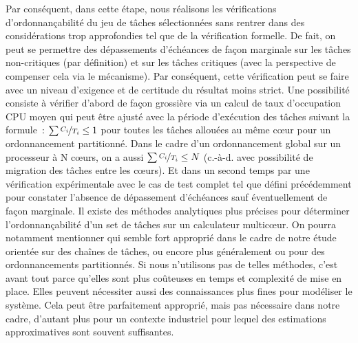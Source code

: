 \documentclass[french, a4paper, 11pt, twoside, pdftex]{StyleThese}
\begin{document}
		Par conséquent, dans cette étape, nous réalisons les vérifications d'ordonnançabilité du jeu de tâches sélectionnées sans rentrer dans des considérations trop approfondies tel que de la vérification formelle. De fait, on peut se permettre des dépassements d'échéances de façon marginale sur les tâches non-critiques (par définition) et sur les tâches critiques (avec la perspective de compenser cela via le mécanisme). Par conséquent, cette vérification peut se faire avec un niveau d'exigence et de certitude du résultat moins strict. Une possibilité consiste à vérifier d'abord de façon grossière via un calcul de taux d'occupation CPU moyen qui peut être ajusté avec la période d'exécution des tâches suivant la formule~:	$ \sum{\nicefrac{C_i}{T_i}} \leq 1 $ pour toutes les tâches allouées au même cœur pour un ordonnancement partitionné. Dans le cadre d'un ordonnancement global sur un processeur à N cœurs, on a aussi $ \sum{\nicefrac{C_i}{T_i}} \leq N $ (c.-à-d. avec possibilité de migration des tâches entre les cœurs). Et dans un second temps par une vérification expérimentale avec le cas de test complet tel que défini précédemment pour constater l'absence de dépassement d'échéances sauf éventuellement de façon marginale. Il existe des méthodes analytiques plus précises pour déterminer l'ordonnançabilité d'un set de tâches sur un calculateur multicœur. On pourra notamment mentionner \cite{melani_schedulability_2016} qui semble fort approprié dans le cadre de notre étude orientée sur des chaînes de tâches, ou encore plus généralement \cite{chen_efficient_2014} ou \cite{han_multicore_2018} pour des ordonnancements partitionnés. Si nous n'utilisons pas de telles méthodes, c'est avant tout parce qu'elles sont plus coûteuses en temps et complexité de mise en place. Elles peuvent nécessiter aussi des connaissances plus fines pour modéliser le système. Cela peut être parfaitement approprié, mais pas nécessaire dans notre cadre, d'autant plus pour un contexte industriel pour lequel des estimations approximatives sont souvent suffisantes.
			
\end{document}
